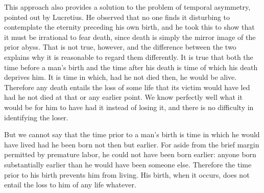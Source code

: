 This approach also provides a solution to the problem of temporal asymmetry,
pointed out by Lucretius. He observed that no one finds it disturbing to
contemplate the eternity preceding his own birth, and he took this to show that
it must be irrational to fear death, since death is simply the mirror image of the
prior abyss. That is not true, however, and the difference between the two explains why it is reasonable to regard them differently. It is true that both the
time before a man's birth and the time after his death is time of which his death
deprives him. It is time in which, had he not died then, he would be alive.
Therefore any death entails the loss of some life that its victim would have led
had he not died at that or any earlier point. We know perfectly well what it
would be for him to have had it instead of losing it, and there is no difficulty in
identifying the loser.

But we cannot say that the time prior to a man's birth is time in which he would
have lived had he been born not then but earlier. For aside from the brief margin
permitted by premature labor, he could not have been born earlier: anyone born
substantially earlier than he would have been someone else. Therefore the time
prior to his birth prevents him from living. His birth, when it occurs, does not
entail the loss to him of any life whatever.

